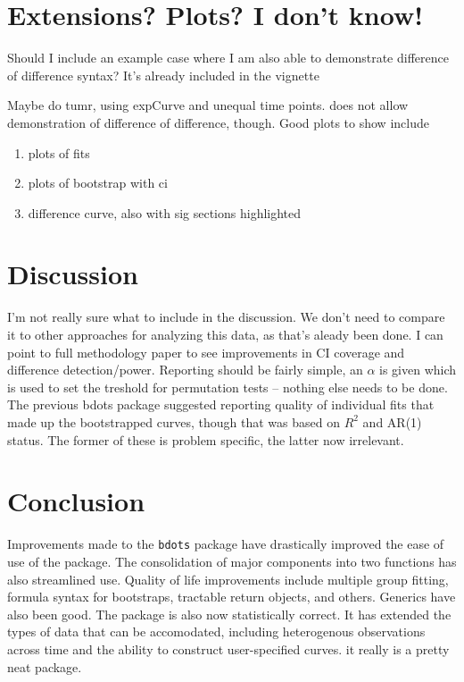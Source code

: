 \documentclass{article}
\begin{document}
\section{Extensions? Plots? I don't know!}

Should I include an example case where I am also able to demonstrate difference of difference syntax? It's already included in the vignette

Maybe do tumr, using expCurve and unequal time points. does not allow demonstration of difference of difference, though. Good plots to show include

\begin{enumerate}
\item plots of fits
\item plots of bootstrap with ci
\item difference curve, also with sig sections highlighted
\end{enumerate}

\section{Discussion}
I'm not really sure what to include in the discussion. We don't need to compare it to other approaches for analyzing this data, as that's aleady been done. I can point to full methodology paper to see improvements in CI coverage and difference detection/power. Reporting should be fairly simple, an $\alpha$ is given which is used to set the treshold for permutation tests -- nothing else needs to be done. The previous bdots package suggested reporting quality of individual fits that made up the bootstrapped curves, though that was based on $R^2$ and AR(1) status. The former of these is problem specific, the latter now irrelevant.


\section{Conclusion}

Improvements made to the \texttt{bdots} package have drastically improved the ease of use of the package. The consolidation of major components into two functions has also streamlined use. Quality of life improvements include multiple group fitting, formula syntax for bootstraps, tractable return objects, and others. Generics have also been good. The package is also now statistically correct. It has extended the types of data that can be accomodated, including heterogenous observations across time and the ability to construct user-specified curves. it really is a pretty neat package.
\end{document}
